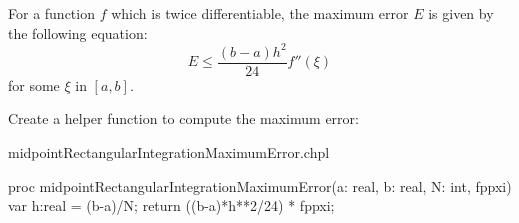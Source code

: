 For a function $f$ which is twice differentiable, the maximum error $E$ is given by
the following equation:
\begin{equation}
E \leq \frac{(b-a)h^2}{24} f''(\xi) \label{eq:rectangle-max-error}
\end{equation}
for some $\xi$ in $[a,b]$.

Create a helper function to compute the maximum error:
\begin{chapelhelper}{midpointRectangularIntegrationMaximumError.chpl}
\begin{chapel}
proc midpointRectangularIntegrationMaximumError(a: real, b: real, N: int, fppxi){
  var h:real = (b-a)/N;
  return ((b-a)*h**2/24) * fppxi;
}
\end{chapel}
\end{chapelhelper}
